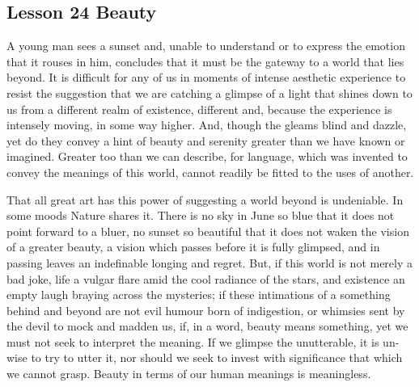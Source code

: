 \documentclass[kindlepaper]{BHCexam4kindle}
\begin{document}
\subsection{Lesson 24
Beauty}
\par
A young man sees a sunset and, unable to understand or to express the emotion
that it rouses in him, concludes that it must be the gateway to a world that lies
beyond. It is difficult for any of us in moments of intense aesthetic experience to
resist the suggestion that we are catching a glimpse of a light that shines down
to us from a different realm of existence, different and, because the experience is
intensely moving, in some way higher. And, though the gleams blind and dazzle,
yet do they convey a hint of beauty and serenity greater than we have known or
imagined. Greater too than we can describe, for language, which was invented
to convey the meanings of this world, cannot readily be fitted to the uses of
another.
\par
That all great art has this power of suggesting a world beyond is undeniable.
In some moods Nature shares it. There is no sky in June so blue that it does not
point forward to a bluer, no sunset so beautiful that it does not waken the vision
of a greater beauty, a vision which passes before it is fully glimpsed, and in
passing leaves an indefinable longing and regret. But, if this world is not merely
a bad joke, life a vulgar flare amid the cool radiance of the stars, and existence
an empty laugh braying across the mysteries; if these intimations of a something
behind and beyond are not evil humour born of indigestion, or whimsies sent by
the devil to mock and madden us, if, in a word, beauty means something, yet we
must not seek to interpret the meaning. If we glimpse the unutterable, it is un-
wise to try to utter it, nor should we seek to invest with significance that which
we cannot grasp. Beauty in terms of our human meanings is meaningless.
\clearpage
\end{document}
